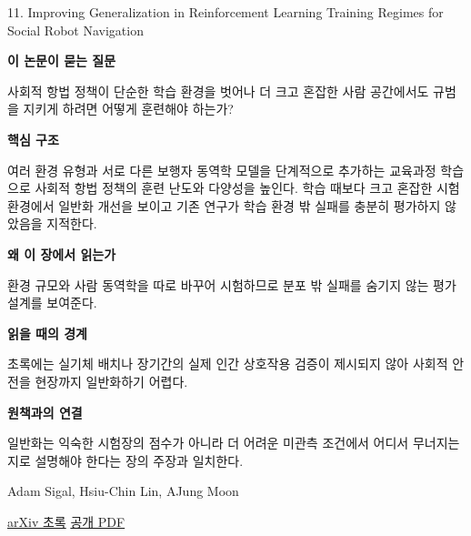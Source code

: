 \documentclass[11pt,openany]{book}
\begin{document}
\begin{termcard}{11. Improving Generalization in Reinforcement Learning Training Regimes for Social Robot Navigation}

\par

\medskip

{\sffamily\bfseries\color{deepblue} 이 논문이 묻는 질문}\par

사회적 항법 정책이 단순한 학습 환경을 벗어나 더 크고 혼잡한 사람 공간에서도 규범을 지키게 하려면 어떻게 훈련해야 하는가?

\smallskip

{\sffamily\bfseries\color{deepblue} 핵심 구조}\par

여러 환경 유형과 서로 다른 보행자 동역학 모델을 단계적으로 추가하는 교육과정 학습으로 사회적 항법 정책의 훈련 난도와 다양성을 높인다. 학습 때보다 크고 혼잡한 시험 환경에서 일반화 개선을 보이고 기존 연구가 학습 환경 밖 실패를 충분히 평가하지 않았음을 지적한다.

\smallskip

{\sffamily\bfseries\color{deepblue} 왜 이 장에서 읽는가}\par

환경 규모와 사람 동역학을 따로 바꾸어 시험하므로 분포 밖 실패를 숨기지 않는 평가 설계를 보여준다.

\smallskip

{\sffamily\bfseries\color{coral} 읽을 때의 경계}\par

초록에는 실기체 배치나 장기간의 실제 인간 상호작용 검증이 제시되지 않아 사회적 안전을 현장까지 일반화하기 어렵다.

\smallskip

{\sffamily\bfseries\color{teal} 원책과의 연결}\par

일반화는 익숙한 시험장의 점수가 아니라 더 어려운 미관측 조건에서 어디서 무너지는지로 설명해야 한다는 장의 주장과 일치한다.

\medskip

{\footnotesize\color{muted} Adam Sigal, Hsiu-Chin Lin, AJung Moon\par

\href{https://arxiv.org/abs/2308.14947}{arXiv 초록} \quad \href{https://arxiv.org/pdf/2308.14947}{공개 PDF}\par}

\end{termcard}
\end{document}
